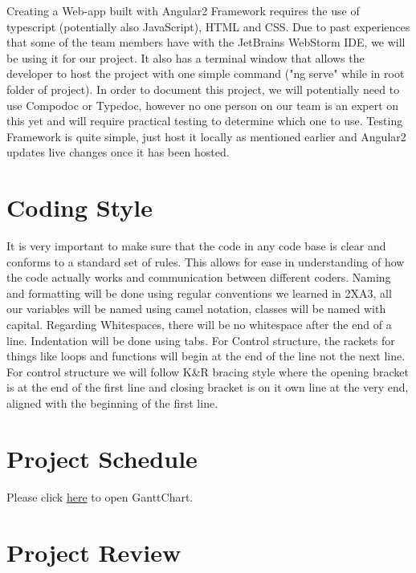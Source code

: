 \documentclass{article}
\begin{document}
Creating a Web-app built with Angular2 Framework requires the use of typescript (potentially also JavaScript), HTML and CSS. Due to past experiences that some of the team members have with the JetBrains WebStorm IDE, we will be using it for our project. It also has a terminal window that allows the developer to host the project with one simple command ("ng serve" while in root folder of project). In order to document this project, we will potentially need to use Compodoc or Typedoc, however no one person on our team is an expert on this yet and will require practical testing to determine which one to use. Testing Framework is quite simple, just host it locally as mentioned earlier and Angular2 updates live changes once it has been hosted. 

\section{Coding Style}
It is very important to make sure that the code in any code base is clear and conforms to a standard set of rules. This allows for ease in understanding of how the code actually works and communication between different coders. Naming and formatting will be done using regular conventions we learned in 2XA3, all our variables will be named using camel notation, classes will be named with capital. Regarding Whitespaces, there will be no whitespace after the end of a line. Indentation will be done using tabs. For Control structure, the rackets for things like loops and functions will begin at the end of the line not the next line. For control structure we will follow K\&R bracing style where the opening bracket is at the end of the first line and closing bracket is on it own line at the very end, aligned with the beginning of the first line. 

\section{Project Schedule}
Please click \href{run:../../ProjectSchedule/GanttChart.gan}{here} to open GanttChart.

\section{Project Review}
\end{document}
